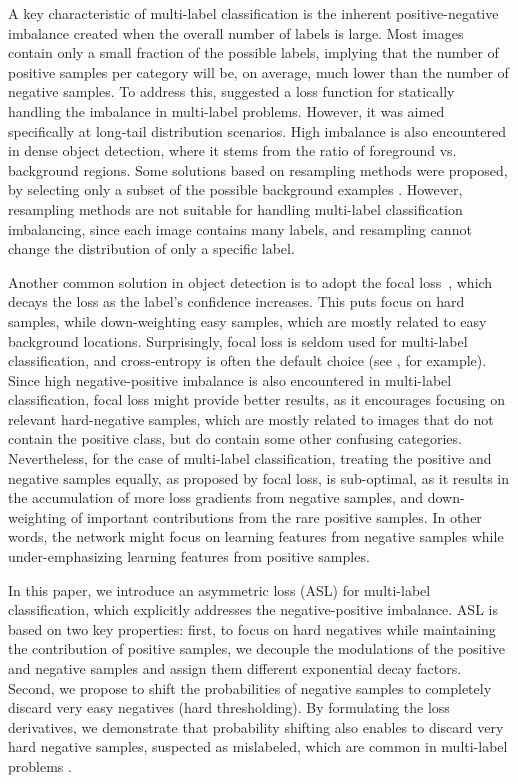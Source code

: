 A key characteristic of multi-label classification is the inherent positive-negative imbalance created when the overall number of labels is large. Most images contain only a small fraction of the possible labels, implying that the number of positive samples per category will be, on average, much lower than the number of negative samples. 
To address this, \cite{tong2020distribution} suggested a loss function for statically handling the imbalance in multi-label problems. However, it was aimed specifically at long-tail distribution scenarios. 
High imbalance is also encountered in dense object detection, where it stems from the ratio of foreground vs. background regions. Some solutions based on resampling methods were proposed, by selecting only a subset of the possible background examples \cite{oksuz2020imbalance}. However, resampling methods are not suitable for handling multi-label classification imbalancing, since each image contains many labels, and resampling cannot change the distribution of only a specific label.

Another common solution in object detection is to adopt the focal loss~\cite{tsung2017focal}, which decays the loss as the label’s confidence increases. This puts focus on hard samples, while down-weighting easy samples, which are mostly related to easy background locations. Surprisingly, focal loss is seldom used for multi-label classification, and cross-entropy is often the default choice (see \cite{chen2019multi_MLGCN,bartlett2008classification,chen2019learning,liu2018multi, gao2020multi}, for example). Since high negative-positive imbalance is also encountered in multi-label classification, focal loss might provide better results, as it encourages focusing on relevant hard-negative samples, which are mostly related to images that do not contain the positive class, but do contain some other confusing categories.
Nevertheless, for the case of multi-label classification, treating the positive and negative samples equally, as proposed by focal loss, is sub-optimal, as it results in the accumulation of more loss gradients from negative samples, and down-weighting of important contributions from the rare positive samples. In other words, the network might focus on learning features from negative samples while under-emphasizing learning features from positive samples.


In this paper, we introduce an asymmetric loss (ASL) for multi-label classification, which explicitly addresses the negative-positive imbalance.
ASL is based on two key properties:
first, to focus on hard negatives while maintaining the contribution of positive samples, we decouple the modulations of the positive and negative samples and assign them different exponential decay factors.
Second, we propose to shift the probabilities of negative samples to completely discard very easy negatives (hard thresholding). By formulating the loss derivatives, we demonstrate that probability shifting also enables to discard very hard negative samples, suspected as mislabeled, which are common in multi-label problems \cite{durand2019learning}.

